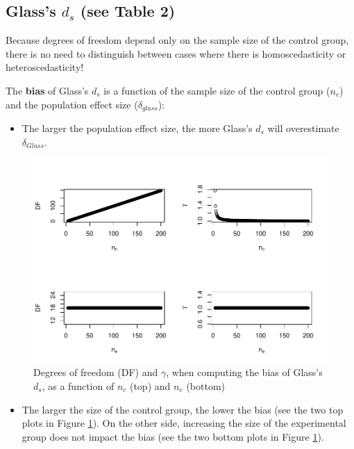 \documentclass[
  man]{apa6}
\providecommand{\tightlist}{%
  \setlength{\itemsep}{0pt}\setlength{\parskip}{0pt}}
\begin{document}
\hypertarget{glasss-d_s-see-table-2}{%
\subsection{\texorpdfstring{Glass's \(d_s\) (see Table 2)}{Glass's d\_s (see Table 2)}}\label{glasss-d_s-see-table-2}}

Because degrees of freedom depend only on the sample size of the control group, there is no need to distinguish between cases where there is homoscedasticity or heteroscedasticity!

The \textbf{bias} of Glass's \(d_s\) is a function of the sample size of the control group (\(n_c\)) and the population effect size (\(\delta_{glass}\)):

\begin{itemize}
\tightlist
\item
  The larger the population effect size, the more Glass's \(d_s\) will overestimate \(\delta_{Glass}\).
\end{itemize}

\begin{figure}
\centering
\includegraphics{Theoretical-Bias-of-all-estimators-as-a-function-of-population-parameters_files/figure-latex/biasGlassctrlsize2-1.pdf}
\caption{\label{fig:biasGlassctrlsize2}Degrees of freedom (DF) and \(\gamma\), when computing the bias of Glass's \(d_s\), as a function of \(n_c\) (top) and \(n_e\) (bottom)}
\end{figure}

\begin{itemize}
\tightlist
\item
  The larger the size of the control group, the lower the bias (see the two top plots in Figure \ref{fig:biasGlassctrlsize2}). On the other side, increasing the size of the experimental group does not impact the bias (see the two bottom plots in Figure \ref{fig:biasGlassctrlsize2}).
\end{itemize}
\end{document}
